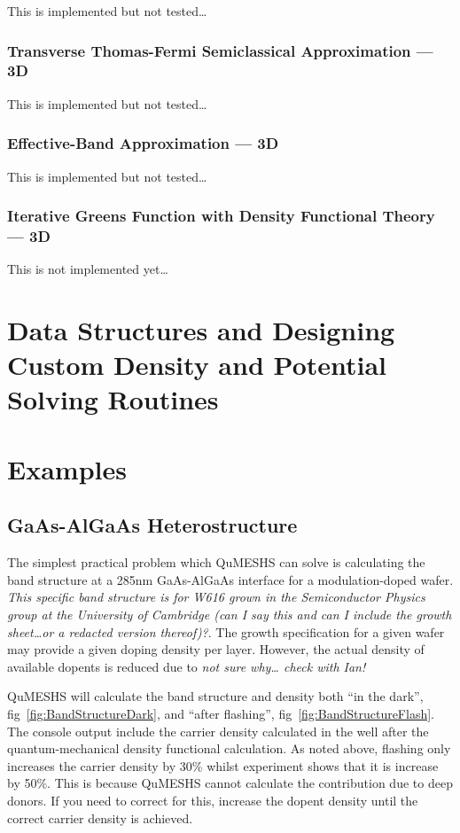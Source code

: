\documentclass[12pt]{article}
\newcommand{\red}[1]{{\color{red} \it #1}}
\begin{document}
This is implemented but not tested\ldots

\subsubsection{Transverse Thomas-Fermi Semiclassical Approximation --- 3D}

This is implemented but not tested\ldots

\subsubsection{Effective-Band Approximation --- 3D}

This is implemented but not tested\ldots

\subsubsection{Iterative Greens Function with Density Functional Theory --- 3D}

This is not implemented yet\ldots


\section{Data Structures and Designing Custom Density and Potential Solving Routines}

\section{Examples}
\label{sec:Examples}

\subsection{GaAs-AlGaAs Heterostructure}
\label{subsec:SimpleBandStructure}

The simplest practical problem which QuMESHS can solve is calculating the
band structure at a 285nm GaAs-AlGaAs interface for a modulation-doped wafer.
\red{This specific band structure is for W616 grown in the Semiconductor Physics
group at the University of Cambridge (can I say this and can I include the
growth sheet\ldots or a redacted version thereof)?}.  The growth specification
for a given wafer may provide a given doping density per layer.  However,
the actual density of available dopents is reduced due to \red{not sure why\ldots
check with Ian!}

QuMESHS will calculate the band structure and density both ``in the dark'',
fig~\ref{fig:BandStructureDark}, and ``after flashing'',
fig~\ref{fig:BandStructureFlash}.  The console output include the carrier
density calculated in the well after the quantum-mechanical density
functional calculation.  As noted above, flashing only increases the carrier
density by 30\% whilst experiment shows that it is increase by 50\%.  This
is because QuMESHS cannot calculate the contribution due to deep donors.
If you need to correct for this, increase the dopent density until the
correct carrier density is achieved.
\end{document}
